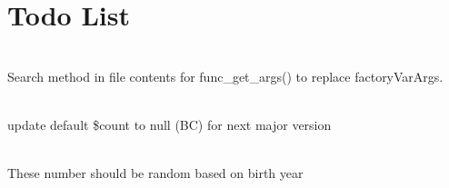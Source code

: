 \chapter{Todo List}
\hypertarget{todo}{}\label{todo}

\begin{DoxyRefList}
\item[Class \doxylink{class_factory_method}{Factory\+Method} ]\hfill \\
\label{todo__todo000008}%
%
Search method in file contents for func\+\_\+get\+\_\+args() to replace factory\+Var\+Args.  
\item[Member \doxylink{class_faker_1_1_provider_1_1_base_a6bc0721bd40b19ddb6ee0f6394cf544f}{Faker\textbackslash{}Provider\textbackslash{}Base\+::random\+Elements} (\$array=\mbox{[}\textquotesingle{}a\textquotesingle{}, \textquotesingle{}b\textquotesingle{}, \textquotesingle{}c\textquotesingle{}\mbox{]}, \$count=1, \$allow\+Duplicates=false)]\hfill \\
\label{todo__todo000002}%
%
update default \$count to {\ttfamily null} (BC) for next major version 
\item[Member \doxylink{class_faker_1_1_provider_1_1nb___n_o_1_1_person_a5a8833555e14cec460d82394347ae0bb}{Faker\textbackslash{}Provider\textbackslash{}nb\+\_\+\+NO\textbackslash{}Person\+::personal\+Identity\+Number} (?\textbackslash{}\doxylink{class_faker_1_1_provider_1_1_date_time}{Date\+Time} \$birthdate=null, \$gender=null)]\hfill \\
\label{todo__todo000003}%
%
These number should be random based on birth year


\end{DoxyRefList}
